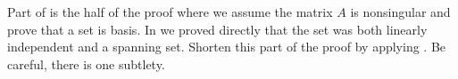 Part of  is the half of the proof where we assume the matrix $A$ is nonsingular and prove that a set is basis.  In  we proved directly that the set was both linearly independent and a spanning set.  Shorten this part of the proof by applying .  Be careful, there is one subtlety.